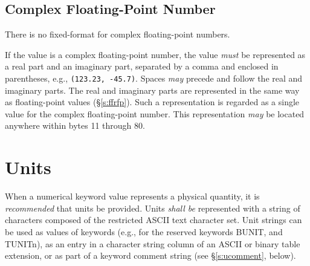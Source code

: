 \documentclass[11pt,makeidx]{book}     %
\begin{document}
   \subsection{Complex Floating-Point Number}
   \label{s:ffcfp}
   There is no fixed-format for complex floating-point numbers.\footnotemark[1]

   If the value is a complex floating-point number, the value {\em must} be 
   represented as a real part and an 
   imaginary part, 
   separated by a comma and enclosed in parentheses,
   e.g., {\tt (123.23, -45.7)}.  Spaces {\em may} precede
   and follow the real and imaginary parts.  The real and imaginary
   parts are represented in the same way as floating-point values (\S\ref{s:ffrfp}).
   Such a representation is
   regarded as a single value for the complex floating-point number.  This 
   representation {\em may} be located anywhere within bytes 11 through 80.

 \section{Units}
  \label{s:Units}

When a numerical keyword value represents a physical 
quantity, it is {\em recommended} that units be provided. Units 
{\em shall be} represented with a string of characters composed of 
the restricted ASCII text character set. Unit strings can be used as 
values of keywords 
(e.g., for the reserved keywords BUNIT, and TUNITn), as an entry in
a character string column of an ASCII or binary table extension,  or 
as part of a keyword comment string (see \S\ref{s:ucomment}, below). 
\end{document}
